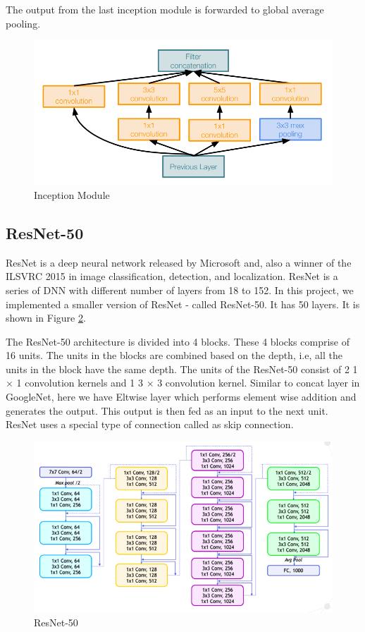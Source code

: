 The output from the last inception module is forwarded to global average pooling.

\begin{figure}[h!]
    \centering
    \includegraphics[scale=0.4]{googlenet}
    \caption{Inception Module \cite{DBLP:journals/corr/SzegedyLJSRAEVR14}}
    \label{fig:InceptionModule}
\end{figure}

\subsection{ResNet-50}
ResNet is a deep neural network released by Microsoft and, also a winner of the ILSVRC 2015 in image classification, detection, and localization. ResNet is a series of DNN with different number of layers from 18 to 152. In this project, we implemented a smaller version of  ResNet - called ResNet-50. It has 50 layers. It is shown in Figure \ref{fig:resnet_50}.

The ResNet-50 architecture is divided into 4 blocks. These 4 blocks comprise of 16 units. The units in the blocks are combined based on the depth, i.e, all the units in the block have the same depth. The units of the ResNet-50 consist of 2 1 $\times$ 1 convolution kernels and 1 3 $\times$ 3 convolution kernel. Similar to concat layer in GoogleNet, here we have Eltwise layer which performs element wise addition and generates the output. This output is then fed as an input to the next unit. ResNet uses a special type of connection called as skip connection.  

\begin{figure}[!htb]
\centering
\includegraphics[scale=0.5]{img/Resne50arch.png}
\caption{ResNet-50 \cite{resnet_fig}}
\label{fig:resnet_50}
\end{figure}

